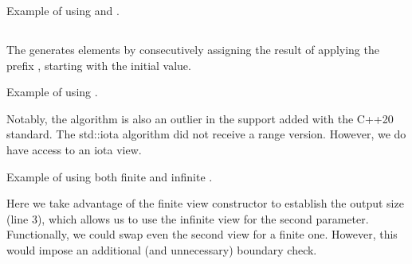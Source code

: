 \begin{box-note}
\footnotesize Example of using  and .
\tcblower
{}
\end{box-note}

\subsection{\texorpdfstring{}{\texttt{std::iota}}}

The  generates elements by consecutively assigning the result of applying the prefix , starting with the initial value.


\begin{box-note}
\footnotesize Example of using .
\tcblower
{}
\end{box-note}

Notably, the  algorithm is also an outlier in the support added with the C++20 standard. The std::iota algorithm did not receive a range version. However, we do have access to an iota view.

\begin{box-note}
\footnotesize Example of using both finite and infinite .
\tcblower
{}
\end{box-note}

Here we take advantage of the finite view constructor  to establish the output size (line 3), which allows us to use the infinite view  for the second parameter. Functionally, we could swap even the second view for a finite one. However, this would impose an additional (and unnecessary) boundary check.

